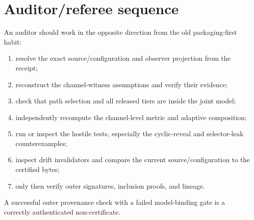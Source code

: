 \documentclass[11pt]{article}
\begin{document}
\section{Auditor/referee sequence}\label{sec:auditor}
An auditor should work in the opposite direction from the old packaging-first habit:
\begin{enumerate}[leftmargin=*]
\item resolve the exact source/configuration and observer projection from the receipt;
\item reconstruct the channel-witness assumptions and verify their evidence;
\item check that path selection and all released tiers are inside the joint model;
\item independently recompute the channel-level metric and adaptive composition;
\item run or inspect the hostile tests, especially the cyclic-reveal and selector-leak counterexamples;
\item inspect drift invalidators and compare the current source/configuration to the certified bytes;
\item only then verify outer signatures, inclusion proofs, and lineage.
\end{enumerate}

A successful outer provenance check with a failed model-binding gate is a correctly authenticated non-certificate.
\end{document}
